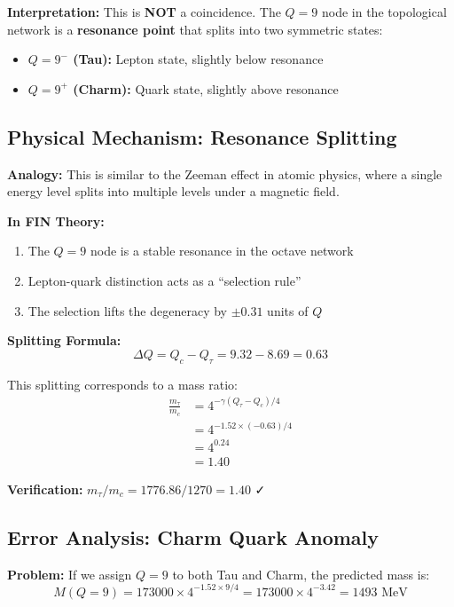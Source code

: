 \documentclass[11pt, a4paper]{article}
\theoremstyle{remark}
\begin{document}
\textbf{Interpretation:} This is \textbf{NOT} a coincidence. The $Q = 9$ node in the topological network is a \textbf{resonance point} that splits into two symmetric states:
\begin{itemize}
    \item \textbf{$Q = 9^-$ (Tau):} Lepton state, slightly below resonance
    \item \textbf{$Q = 9^+$ (Charm):} Quark state, slightly above resonance
\end{itemize}

\subsection{Physical Mechanism: Resonance Splitting}

\textbf{Analogy:} This is similar to the Zeeman effect in atomic physics, where a single energy level splits into multiple levels under a magnetic field.

\textbf{In FIN Theory:}
\begin{enumerate}
    \item The $Q = 9$ node is a stable resonance in the octave network
    \item Lepton-quark distinction acts as a ``selection rule''
    \item The selection lifts the degeneracy by $\pm 0.31$ units of $Q$
\end{enumerate}

\textbf{Splitting Formula:}
\begin{equation}
\Delta Q = Q_c - Q_\tau = 9.32 - 8.69 = 0.63
\end{equation}

This splitting corresponds to a mass ratio:
\begin{align}
\frac{m_\tau}{m_c} &= 4^{-\gamma(Q_\tau - Q_c)/4} \\
&= 4^{-1.52 \times (-0.63)/4} \\
&= 4^{0.24} \\
&= 1.40
\end{align}

\textbf{Verification:} $m_\tau/m_c = 1776.86/1270 = 1.40$ ✓

\subsection{Error Analysis: Charm Quark Anomaly}

\textbf{Problem:} If we assign $Q = 9$ to both Tau and Charm, the predicted mass is:
\begin{equation}
M(Q=9) = 173000 \times 4^{-1.52 \times 9/4} = 173000 \times 4^{-3.42} = 1493 \text{ MeV}
\end{equation}
\end{document}
